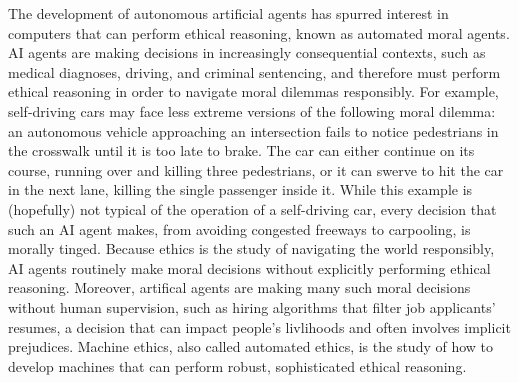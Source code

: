 %
\begin{isabellebody}%
%
%
\isadelimtheory
%
\endisadelimtheory
%
\isatagtheory
%
\endisatagtheory
{\isafoldtheory}%
%
\isadelimtheory
%
\endisadelimtheory
%
\isadelimdocument
%
\endisadelimdocument
%
\isatagdocument
%
\isamarkuptrue%
%
\endisatagdocument
{\isafolddocument}%
%
\isadelimdocument
%
\endisadelimdocument
%
\begin{isamarkuptext}%
The development of autonomous artificial agents has spurred interest in computers that can perform 
ethical reasoning, known as automated moral agents. AI agents are making decisions in increasingly 
consequential contexts, such as medical diagnoses, driving, and criminal sentencing, and therefore 
must perform ethical reasoning in order to navigate moral dilemmas responsibly. For example, self-driving
cars may face less extreme versions of the following moral dilemma: an autonomous vehicle approaching 
an intersection fails to notice pedestrians in the crosswalk until it is too late to brake. The car 
can either continue on its course, running over and killing three pedestrians, or it can swerve to 
hit the car in the next lane, killing the single passenger inside it. While this example is (hopefully) 
not typical of the operation of a self-driving car, every decision that such an AI agent makes, from 
avoiding congested freeways to carpooling, is morally tinged. Because ethics is the study of navigating 
the world responsibly, AI agents routinely make moral decisions without explicitly performing ethical
reasoning. Moreover, artifical agents are making many such moral decisions without
human supervision, such as hiring algorithms that filter job applicants' resumes, a decision that can
impact people's livlihoods and often involves implicit prejudices. Machine ethics, also called 
automated ethics, is the study of how to develop machines that can perform robust, sophisticated ethical reasoning. 


\end{isamarkuptext}
\end{isabellebody}
